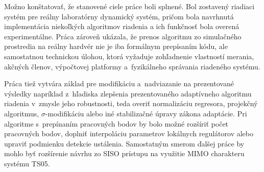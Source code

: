 Možno konštatovať, že stanovené ciele práce boli splnené. Bol zostavený riadiaci
systém pre reálny laboratórny dynamický systém, pričom bola navrhnutá implementácia niekoľkých algoritmov riadenia a ich funkčnosť bola overená experimentálne. Práca
zároveň ukázala, že prenos algoritmu zo simulačného prostredia na reálny hardvér
nie je iba formálnym prepísaním kódu, ale samostatnou technickou úlohou, ktorá
vyžaduje zohľadnenie vlastností merania, akčných členov, výpočtovej platformy
a~fyzikálneho správania riadeného systému.

Práca tiež vytvára základ pre modifikáciu a~nadviazanie na prezentované výsledky napríklad z~hľadiska zlepšenia prezentovaného adaptívneho algoritmu riadenia v~zmysle jeho robustnosti, teda overiť normalizáciu
regresora, projekčný algoritmus, \mbox{$\sigma$-modifikáciu} alebo iné stabilizačné úpravy
zákona adaptácie. Pri algoritme s~prepínaním pracovných bodov by bolo možné
rozšíriť počet pracovných bodov, doplniť interpoláciu parametrov lokálnych
regulátorov alebo upraviť podmienku detekcie ustálenia. Samostatným smerom
ďalšej práce by mohlo byť rozšírenie návrhu zo SISO prístupu na využitie MIMO charakteru
systému TS05.